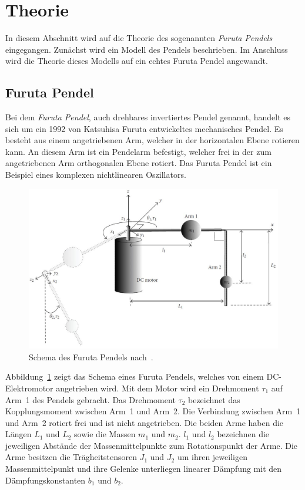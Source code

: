 \section{Theorie}
\label{sec.Theorie}
In diesem Abschnitt wird auf die Theorie des sogenannten \emph{Furuta Pendels} eingegangen. Zunächst wird ein Modell des Pendels beschrieben. Im Anschluss wird die Theorie dieses Modells auf ein echtes Furuta Pendel angewandt. %

\subsection{Furuta Pendel}
\label{sub.Furuta-Pendel}
Bei dem \emph{Furuta Pendel}, auch drehbares invertiertes Pendel genannt, handelt es sich um ein 1992 von Katsuhisa Furuta entwickeltes mechanisches Pendel. 
Es besteht aus einem angetriebenen Arm, welcher in der horizontalen Ebene rotieren kann. 
An diesem Arm ist ein Pendelarm befestigt, welcher frei in der zum angetriebenen Arm orthogonalen Ebene rotiert. 
Das Furuta Pendel ist ein Beispiel eines komplexen nichtlinearen Oszillators. \citep{Cazzolato.2011}

\begin{figure}[htbp]
	\centering
	\includegraphics[width=1.\textwidth]{Grafiken/furuta3.jpg}
	\caption{Schema des Furuta Pendels nach~\cite{Cazzolato.2011}. }
	\label{fig.furuta-schematic}
\end{figure}

Abbildung~\ref{fig.furuta-schematic} zeigt das Schema eines Furuta Pendels, welches von einem DC-Elektromotor angetrieben wird.
Mit dem Motor wird ein Drehmoment $\tau_1$ auf Arm~1 des Pendels gebracht. 
Das Drehmoment $\tau_2$ bezeichnet das Kopplungsmoment zwischen Arm~1 und Arm~2. 
Die Verbindung zwischen Arm~1 und Arm~2 rotiert frei und ist nicht angetrieben.
Die beiden Arme haben die Längen $L_1$ und $L_2$ sowie die Massen $m_1$ und $m_2$.
$l_1$ und $l_2$ bezeichnen die jeweiligen Abstände der Massenmittelpunkte zum Rotationspunkt der Arme.
Die Arme besitzen die Trägheitstensoren $J_1$ und $J_2$ um ihren jeweiligen Massenmittelpunkt und ihre Gelenke unterliegen linearer Dämpfung mit den Dämpfungskonstanten $b_1$ und $b_2$.

